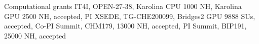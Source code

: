 \begin{rubric}{Computational grants}
%
\entry*[\hspace{1.05cm}2023]%
  IT4I, OPEN-27-38, Karolina CPU 1000 NH, Karolina GPU 2500 NH, accepted, PI
\entry*[2021]%
  XSEDE, TG-CHE200099, Bridges2 GPU 9888 SUs, accepted, Co-PI
\entry*[2020]%
  Summit, CHM179, 13000 NH, accepted, PI
\entry*[2019]%
  Summit, BIP191, 25000 NH, accepted 
\end{rubric}